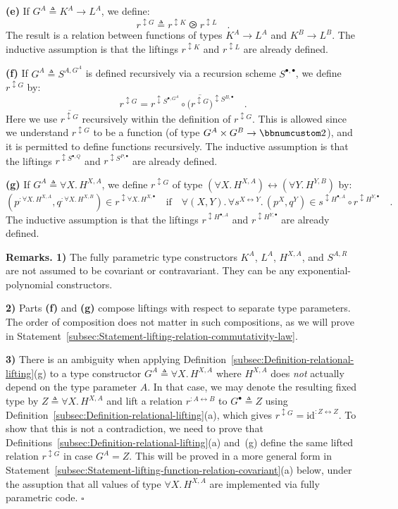 \textbf{(e)} If $G^{A}\triangleq K^{A}\rightarrow L^{A}$, we define:
\[
r^{\updownarrow G}\triangleq r^{\updownarrow K}\ogreaterthan r^{\updownarrow L}\quad.
\]
The result is a relation between functions of types $K^{A}\rightarrow L^{A}$
and $K^{B}\rightarrow L^{B}$. The inductive assumption is that the
liftings $r^{\updownarrow K}$ and $r^{\updownarrow L}$ are already
defined.

\textbf{(f)} If $G^{A}\triangleq S^{A,G^{A}}$ is defined recursively
via a recursion scheme $S^{\bullet,\bullet}$, we define $r^{\updownarrow G}$
by:
\[
r^{\updownarrow G}=r^{\updownarrow S^{\bullet,G^{A}}}\circ\big(\overline{r^{\updownarrow G}}\big)^{\updownarrow S^{B,\bullet}}\quad.
\]
Here we use $\overline{r^{\updownarrow G}}$ recursively within the
definition of $r^{\updownarrow G}$. This is allowed since we understand
$r^{\updownarrow G}$ to be a function (of type $G^{A}\times G^{B}\rightarrow\bbnum 2$),
and it is permitted to define functions recursively. The inductive
assumption is that the liftings $r^{\updownarrow S^{\bullet,Q}}$
and $r^{\updownarrow S^{P,\bullet}}$ are already defined. 

\textbf{(g)} If $G^{A}\triangleq\forall X.\,H^{X,A}$, we define $r^{\updownarrow G}$
of type $(\forall X.\,H^{X,A})\leftrightarrow(\forall Y.\,H^{Y,B})$
by:
\[
(p^{:\forall X.\,H^{X,A}},q^{:\forall X.\,H^{X,B}})\in r^{\updownarrow\forall X.\,H^{X,\bullet}}\quad\text{if}\quad\forall(X,Y).\,\forall s^{X\leftrightarrow Y}.\,(p^{X},q^{Y})\in s^{\updownarrow H^{\bullet,A}}\circ r^{\updownarrow H^{Y,\bullet}}\quad.
\]
The inductive assumption is that the liftings $r^{\updownarrow H^{\bullet,A}}$
and $r^{\updownarrow H^{Y,\bullet}}$ are already defined.

\textbf{Remarks. 1)} The fully parametric type constructors $K^{A}$,
$L^{A}$, $H^{X,A}$, and $S^{A,R}$ are not assumed to be covariant
or contravariant. They can be any exponential-polynomial constructors.

\textbf{2)} Parts \textbf{(f)} and \textbf{(g)} compose liftings with
respect to separate type parameters. The order of composition does
not matter in such compositions, as we will prove in Statement~\ref{subsec:Statement-lifting-relation-commutativity-law}. 

\textbf{3)} There is an ambiguity when applying Definition~\ref{subsec:Definition-relational-lifting}(g)
to a type constructor $G^{A}\triangleq\forall X.\,H^{X,A}$ where
$H^{X,A}$ does \emph{not} actually depend on the type parameter $A$.
In that case, we may denote the resulting fixed type by $Z\triangleq\forall X.\,H^{X,A}$
and lift a relation $r^{:A\leftrightarrow B}$ to $G^{\bullet}\triangleq Z$
using Definition~\ref{subsec:Definition-relational-lifting}(a),
which gives $r^{\updownarrow G}=\text{id}^{:Z\leftrightarrow Z}$.
To show that this is not a contradiction, we need to prove that Definitions~\ref{subsec:Definition-relational-lifting}(a)
and~(g) define the same lifted relation $r^{\updownarrow G}$ in
case $G^{A}=Z$. This will be proved in a more general form in Statement~\ref{subsec:Statement-lifting-function-relation-covariant}(a)
below, under the assuption that all values of type $\forall X.\,H^{X,A}$
are implemented via fully parametric code. $\square$

